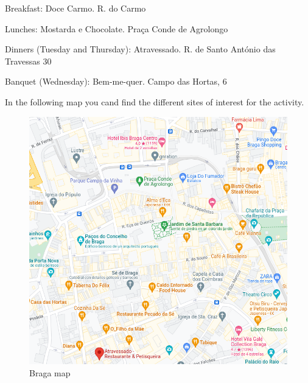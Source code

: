 \documentclass[11pt]{article}
\begin{document}
Breakfast:
Doce Carmo.
R. do Carmo

Lunches:
Mostarda e Chocolate.
Praça Conde de Agrolongo

Dinners (Tuesday and Thursday):
Atravessado.
R. de Santo António das Travessas 30

Banquet (Wednesday):
Bem-me-quer.
Campo das Hortas, 6


In the following map you cand find the different sites of interest for the activity.

\begin{figure}[ht]
    \centering
    \includegraphics[scale=0.5, keepaspectratio]{braga_map.png}
    \caption{Braga map}
    \label{figure:map}
 \end{figure}
\end{document}
